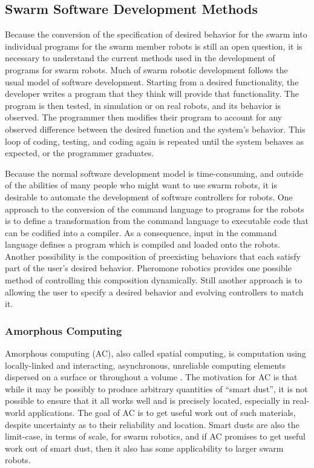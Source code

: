 \documentclass[]{article}
\begin{document}
\subsection{Swarm Software Development Methods}

Because the conversion of the specification of desired behavior for the swarm into individual programs for the swarm member robots is still an open question, it is necessary to understand the current methods used in the development of programs for swarm robots. 
Much of swarm robotic development follows the usual model of software development. 
Starting from a desired functionality, the developer writes a program that they think will provide that functionality.
The program is then tested, in simulation or on real robots, and its behavior is observed. 
The programmer then modifies their program to account for any observed difference between the desired function and the system's behavior. 
This loop of coding, testing, and coding again is repeated until the system behaves as expected, or the programmer graduates. 

Because the normal software development model is time-consuming, and outside of the abilities of many people who might want to use swarm robots, it is desirable to automate the development of software controllers for robots. 
One approach to the conversion of the command language to programs for the robots is to define a transformation from the command language to executable code that can be codified into a compiler. 
As a consequence, input in the command language defines a program which is compiled and loaded onto the robots. 
Another possibility is the composition of preexisting behaviors that each satisfy part of the user's desired behavior. 
Pheromone robotics provides one possible method of controlling this composition dynamically. 
Still another approach is to allowing the user to specify a desired behavior and evolving controllers to match it. 

\subsubsection{Amorphous Computing}

Amorphous computing (AC), also called spatial computing, is computation using locally-linked and interacting, asynchronous, unreliable computing elements dispersed on a surface or throughout a volume \cite{abelson2000amorphous}. 
The motivation for AC is that while it may be possibly to produce arbitrary quantities of ``smart dust'', it is not possible to ensure that it all works well and is precisely located, especially in real-world applications.
The goal of AC is to get useful work out of such materials, despite uncertainty as to their reliability and location. 
Smart dusts are also the limit-case, in terms of scale, for swarm robotics, and if AC promises to get useful work out of smart dust, then it also has some applicability to larger swarm robots.
\end{document}
